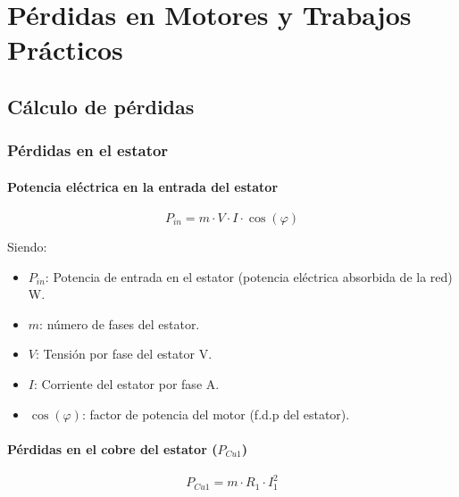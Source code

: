 \documentclass[../main]{subfiles}
\begin{document}
\chapter{Pérdidas en Motores y Trabajos Prácticos}
\begin{center}
\end{center}


\section{Cálculo de pérdidas}

\subsection{Pérdidas en el estator}

\subsubsection{Potencia eléctrica en la entrada del estator}
\begin{equation}
  P_{in} = m \cdot V \cdot I \cdot \cos(\varphi)
\end{equation}

Siendo:
\begin{itemize}
  \item $P_{in}$: Potencia de entrada en el estator (potencia eléctrica absorbida de la red) \unit{W}.
  \item $m$: número de fases del estator.
  \item $V$: Tensión por fase del estator \unit{V}.
  \item $I$: Corriente del estator por fase \unit{A}.
  \item $\cos(\varphi)$: factor de potencia del motor (f.d.p del estator).
\end{itemize}

\subsubsection{Pérdidas en el cobre del estator ($P_{Cu1}$)}
\begin{equation}
  P_{Cu1} = m \cdot R_1 \cdot I_1^2
\end{equation}
\end{document}
